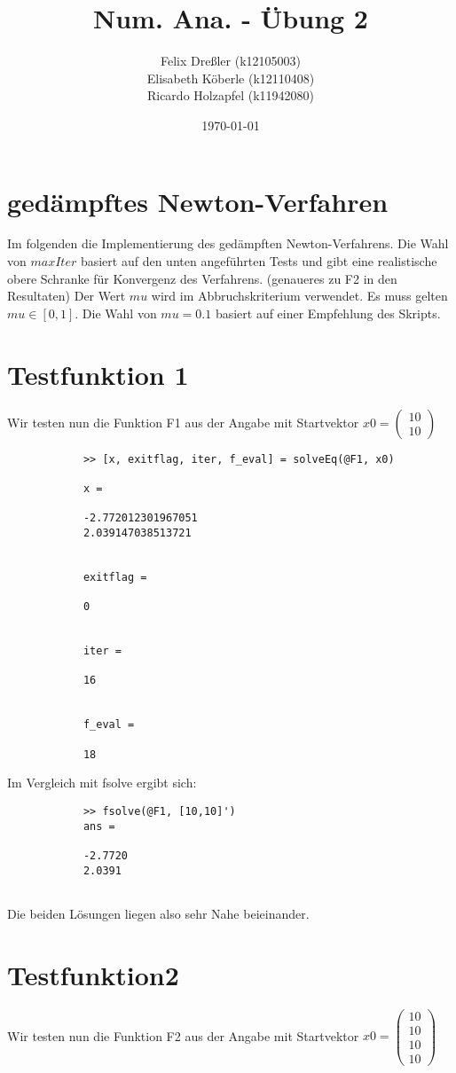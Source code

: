 \documentclass[11pt,titlepage]{article}
\title{Num. Ana. - Übung 2}
\author{Felix Dreßler (k12105003) \\ Elisabeth Köberle (k12110408) \\ Ricardo Holzapfel (k11942080)}
\date{\today} %
\begin{document}
\maketitle
	
	\section{gedämpftes Newton-Verfahren}
		Im folgenden die Implementierung des gedämpften Newton-Verfahrens. Die Wahl von $maxIter$ basiert auf den unten angeführten Tests und gibt eine realistische obere Schranke für Konvergenz des Verfahrens. (genaueres zu F2 in den Resultaten)
		Der Wert $mu$ wird im Abbruchskriterium verwendet. Es muss gelten $mu \in [0,1]$. Die Wahl von $ mu = 0.1$ basiert auf einer Empfehlung des Skripts.
	
		


\newpage
	\section{Testfunktion 1}
		Wir testen nun die Funktion F1 aus der Angabe mit Startvektor $ x0 = \begin{pmatrix} 10 \\ 10\end{pmatrix} $
		
		\begin{lstlisting}
			>> [x, exitflag, iter, f_eval] = solveEq(@F1, x0)
			
			x =
			
			-2.772012301967051
			2.039147038513721
			
			
			exitflag =
			
			0
			
			
			iter =
			
			16
			
			
			f_eval =
			
			18
		\end{lstlisting}
	
		Im Vergleich mit fsolve ergibt sich:
		
		\begin{lstlisting}
			>> fsolve(@F1, [10,10]')
			ans =
			
			-2.7720
			2.0391
			
		\end{lstlisting}
		
		Die beiden Lösungen liegen also sehr Nahe beieinander.
		
	\section{Testfunktion2}
		Wir testen nun die Funktion F2 aus der Angabe mit Startvektor $ x0 = \begin{pmatrix} 10 \\ 10 \\ 10 \\10 \end{pmatrix} $
		
\end{document}
